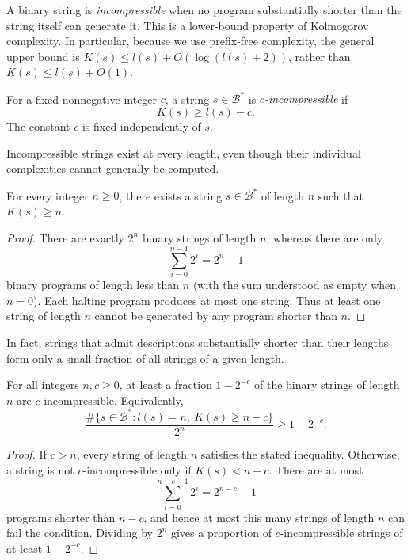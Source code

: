 A binary string is \emph{incompressible} when no program substantially shorter than the string itself can generate it. This is a lower-bound property of Kolmogorov complexity. In particular, because we use prefix-free complexity, the general upper bound is $K(s)\leq l(s)+O(\log(l(s)+2))$, rather than $K(s)\leq l(s)+O(1)$.

\begin{definition}
\label{def:c-incompressible}
For a fixed nonnegative integer $c$, a string $s\in\mathcal{B}^*$ is \emph{$c$-incompressible} if
\[
K(s)\geq l(s)-c.
\]
The constant $c$ is fixed independently of $s$.
\end{definition}

Incompressible strings exist at every length, even though their individual complexities cannot generally be computed.

\begin{proposition}
\label{prop:incompressible-existence}
For every integer $n\geq0$, there exists a string $s\in\mathcal{B}^*$ of length $n$ such that $K(s)\geq n$.
\end{proposition}
\begin{proof}
There are exactly $2^n$ binary strings of length $n$, whereas there are only
\[
\sum_{i=0}^{n-1}2^i=2^n-1
\]
binary programs of length less than $n$ (with the sum understood as empty when $n=0$). Each halting program produces at most one string. Thus at least one string of length $n$ cannot be generated by any program shorter than $n$.
\end{proof}

In fact, strings that admit descriptions substantially shorter than their lengths form only a small fraction of all strings of a given length.

\begin{proposition}
\label{prop:incompressible-frequency}
For all integers $n,c\geq0$, at least a fraction $1-2^{-c}$ of the binary strings of length $n$ are $c$-incompressible. Equivalently,
\[
\frac{\#\{s\in\mathcal{B}^*:l(s)=n,\ K(s)\geq n-c\}}{2^n} \geq 1-2^{-c}.
\]
\end{proposition}
\begin{proof}
If $c>n$, every string of length $n$ satisfies the stated inequality. Otherwise, a string is not $c$-incompressible only if $K(s)<n-c$. There are at most
\[
\sum_{i=0}^{n-c-1}2^i=2^{n-c}-1
\]
programs shorter than $n-c$, and hence at most this many strings of length $n$ can fail the condition. Dividing by $2^n$ gives a proportion of $c$-incompressible strings of at least $1-2^{-c}$.
\end{proof}

